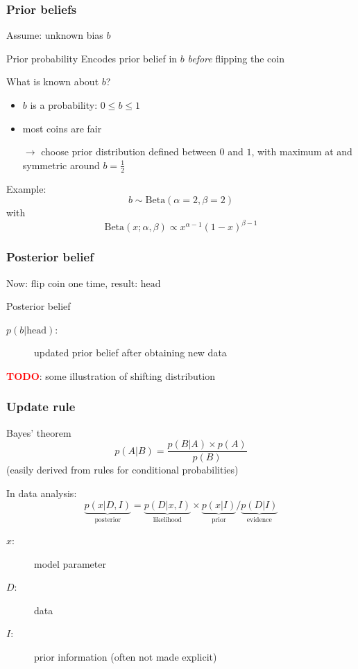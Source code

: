 \documentclass[t, aspectratio=169]{beamer}
\newcommand{\todo}{\textcolor{red}{\textbf{TODO}}}
\begin{document}
\begin{frame}
  \frametitle{Prior beliefs}
  Assume: unknown bias $b$
  \begin{block}{Prior probability}
    Encodes prior belief in $b$ \textit{before} flipping the coin
  \end{block}
  What is known about $b$?
  \begin{itemize}
  \item $b$ is a probability: $0 \leq b \leq 1$
  \item most coins are fair
  \end{itemize}
  \begin{itemize}
  \item[$\rightarrow$] choose prior distribution defined between $0$ and $1$, with maximum at and symmetric around $b=\frac{1}{2}$
  \end{itemize}
  Example:
  \begin{equation*}
    b \sim \mathrm{Beta}(\alpha=2,\beta=2)
  \end{equation*}
  with
  \begin{equation*}
    \mathrm{Beta}(x;\alpha, \beta) \propto x^{\alpha-1}(1-x)^{\beta-1}
  \end{equation*}
\end{frame}


\begin{frame}
  \frametitle{Posterior belief}
  Now: flip coin one time, result: $\mathrm{head}$
  \begin{block}{Posterior belief}
    \begin{description}
      \item[$p(b|\mathrm{head})$:] updated prior belief after obtaining new data
    \end{description}
  \end{block}
  \todo: some illustration of shifting distribution
\end{frame}


\begin{frame}
  \frametitle{Update rule}
  \begin{block}{Bayes' theorem}
    \begin{equation*}
      p(A|B) = \frac{p(B|A) \times p(A)}{p(B)}
    \end{equation*}
    (easily derived from rules for conditional probabilities)
  \end{block}
  In data analysis:
  \begin{equation*}
    \underbrace{p(x|D,I)}_{\mathrm{posterior}} = \underbrace{p(D|x,I)}_{\mathrm{likelihood}} \times \underbrace{p(x|I)}_{\mathrm{prior}} / \underbrace{p(D|I)}_{\mathrm{evidence}}
  \end{equation*}
  \begin{description}
  \item[$x$:] model parameter
  \item[$D$:] data
  \item[$I$:] prior information (often not made explicit)
  \end{description}
\end{frame}
\end{document}
